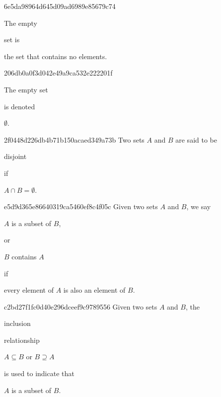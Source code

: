 \begin{note}{6e5da98964d645d09ad6989e85679c74}
    \begin{icloze}{2}The empty\end{icloze} set is \begin{icloze}{1}the set that contains no elements.\end{icloze}
\end{note}

\begin{note}{206db0a0f3d042e49a9ca532e222201f}
    \begin{icloze}{2}The empty set\end{icloze} is denoted \begin{icloze}{1}\({ \emptyset }\).\end{icloze}
\end{note}

\begin{note}{2f0448d226db4b71b150acaed349a73b}
    Two sets \({ A }\) and \({ B }\) are said to be \begin{icloze}{2}disjoint\end{icloze} if \begin{icloze}{1}\({ A \cap B = \emptyset }\).\end{icloze}
\end{note}

\begin{note}{e5d9d365e86640319ca5460ef8c4f05c}
    Given two sets \({ A }\) and \({ B }\), we say \begin{icloze}{2}\({ A }\) is a subset of \({ B }\),\end{icloze} or \begin{icloze}{2}\({ B }\) contains \({ A }\)\end{icloze} if \begin{icloze}{1}every element of \({ A }\) is also an element of \({ B }\).\end{icloze}
\end{note}

\begin{note}{c2bd27f1fc0d40e296dceef9c9789556}
    Given two sets \({ A }\) and \({ B }\), the \begin{icloze}{3}inclusion\end{icloze} relationship \begin{icloze}{2}\({ A \subseteq B }\) or \({ B \supseteq A }\)\end{icloze} is used to indicate that \begin{icloze}{1}\({ A }\) is a subset of \({ B }\).\end{icloze}
\end{note}

